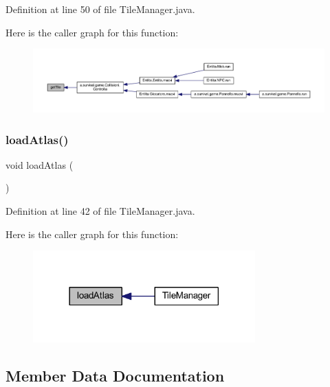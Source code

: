 Definition at line 50 of file Tile\+Manager.\+java.

Here is the caller graph for this function\+:
\nopagebreak
\begin{figure}[H]
\begin{center}
\leavevmode
\includegraphics[width=350pt]{classblocchi_1_1_tile_manager_a1855b58fdbe502789d9c14ee0deffb9e_icgraph}
\end{center}
\end{figure}
\mbox{\label{classblocchi_1_1_tile_manager_afc6b9f4a25216ec36baa6e7518a7501a}} 
\subsubsection{\texorpdfstring{load\+Atlas()}{loadAtlas()}}
{\footnotesize\ttfamily void load\+Atlas (\begin{DoxyParamCaption}{ }\end{DoxyParamCaption})\hspace{0.3cm}{\ttfamily [private]}}



Definition at line 42 of file Tile\+Manager.\+java.

Here is the caller graph for this function\+:
\nopagebreak
\begin{figure}[H]
\begin{center}
\leavevmode
\includegraphics[width=242pt]{classblocchi_1_1_tile_manager_afc6b9f4a25216ec36baa6e7518a7501a_icgraph}
\end{center}
\end{figure}


\subsection{Member Data Documentation}
\mbox{\label{classblocchi_1_1_tile_manager_a0f6db27994c397bfb9bb56d539707c02}} 
